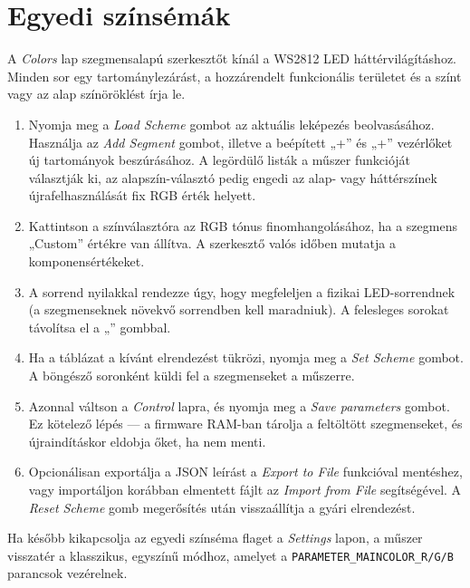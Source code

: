 \section{Egyedi színsémák}
A \emph{Colors} lap szegmensalapú szerkesztőt kínál a WS2812 LED háttérvilágításhoz. Minden sor egy tartománylezárást, a hozzárendelt funkcionális területet és a színt vagy az alap színöröklést írja le.

\begin{enumerate}
    \item Nyomja meg a \emph{Load Scheme} gombot az aktuális leképezés beolvasásához. Használja az \emph{Add Segment} gombot, illetve a beépített „+\textuparrow{}” és „+\textdownarrow{}” vezérlőket új tartományok beszúrásához. A legördülő listák a műszer funkcióját választják ki, az alapszín-választó pedig engedi az alap- vagy háttérszínek újrafelhasználását fix RGB érték helyett.
    \item Kattintson a színválasztóra az RGB tónus finomhangolásához, ha a szegmens „Custom” értékre van állítva. A szerkesztő valós időben mutatja a komponensértékeket.
    \item A sorrend nyilakkal rendezze úgy, hogy megfeleljen a fizikai LED-sorrendnek (a szegmenseknek növekvő sorrendben kell maradniuk). A felesleges sorokat távolítsa el a „\texttimes{}” gombbal.
    \item Ha a táblázat a kívánt elrendezést tükrözi, nyomja meg a \emph{Set Scheme} gombot. A böngésző soronként küldi fel a szegmenseket a műszerre.
    \item Azonnal váltson a \emph{Control} lapra, és nyomja meg a \emph{Save parameters} gombot. Ez kötelező lépés — a firmware RAM-ban tárolja a feltöltött szegmenseket, és újraindításkor eldobja őket, ha nem menti.
    \item Opcionálisan exportálja a JSON leírást a \emph{Export to File} funkcióval mentéshez, vagy importáljon korábban elmentett fájlt az \emph{Import from File} segítségével. A \emph{Reset Scheme} gomb megerősítés után visszaállítja a gyári elrendezést.
\end{enumerate}

Ha később kikapcsolja az egyedi színséma flaget a \emph{Settings} lapon, a műszer visszatér a klasszikus, egyszínű módhoz, amelyet a \verb|PARAMETER_MAINCOLOR_R/G/B| parancsok vezérelnek.
